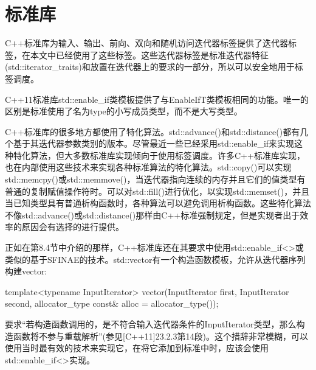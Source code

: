 \section{标准库}
C++标准库为输入、输出、前向、双向和随机访问迭代器标签提供了迭代器标签，在本文中已经使用了这些标签。这些迭代器标签是标准迭代器特征(std::iterator\_traits)和放置在迭代器上的要求的一部分，所以可以安全地用于标签调度。

C++11标准库std::enable\_if类模板提供了与EnableIfT类模板相同的功能。唯一的区别是标准使用了名为type的小写成员类型，而不是大写类型。

C++标准库的很多地方都使用了特化算法。std::advance()和std::distance()都有几个基于其迭代器参数类别的版本。尽管最近一些已经采用std::enable\_if来实现这种特化算法，但大多数标准库实现倾向于使用标签调度。许多C++标准库实现，也在内部使用这些技术来实现各种标准算法的特化算法。std::copy()可以实现std::memcpy()或std::memmove()，当迭代器指向连续的内存并且它们的值类型有普通的复制赋值操作符时。可以对std::fill()进行优化，以实现std::memset()，并且当已知类型具有普通析构函数时，各种算法可以避免调用析构函数。这些特化算法不像std::advance()或std::distance()那样由C++标准强制规定，但是实现者出于效率的原因会有选择的进行提供。

正如在第8.4节中介绍的那样，C++标准库还在其要求中使用std::enable\_if<>或类似的基于SFINAE的技术。std::vector有一个构造函数模板，允许从迭代器序列构建vector:

\begin{cpp}
template<typename InputIterator>
vector(InputIterator first, InputIterator second,
		allocator_type const& alloc = allocator_type());
\end{cpp}

要求“若构造函数调用的，是不符合输入迭代器条件的InputIterator类型，那么构造函数将不参与重载解析”(参见[C++11]23.2.3第14段)。这个措辞非常模糊，可以使用当时最有效的技术来实现它，在将它添加到标准中时，应该会使用std::enable\_if<>实现。
























